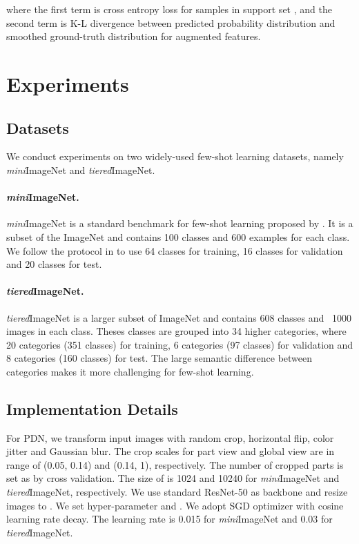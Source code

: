 \documentclass{article}
\begin{document}
where the first term is cross entropy loss for samples in support set , and the second term is K-L divergence between predicted probability distribution  and smoothed ground-truth distribution  for augmented features.

\section{Experiments}

\subsection{Datasets}
We conduct experiments on two widely-used few-shot learning datasets, namely \emph{mini}ImageNet and \emph{tiered}ImageNet. 
\paragraph{\emph{mini}ImageNet.} \emph{mini}ImageNet is a standard benchmark for few-shot learning proposed by \cite{vinyals2016matching}. It is a subset of the ImageNet \cite{ILSVRC15} and contains 100 classes and 600 examples for each class. We follow the protocol in \cite{Ravi2017OptimizationAA} to use 64 classes for training, 16 classes for validation and 20 classes for test. 

\paragraph{\emph{tiered}ImageNet.} \emph{tiered}ImageNet \cite{ren2018metalearning} is a larger subset of ImageNet and contains 608 classes and ~1000 images in each class. Theses classes are grouped into 34 higher categories, where 20 categories (351 classes) for training, 6 categories (97 classes) for validation and 8 categories (160 classes) for test. The large semantic difference between categories makes it more challenging for few-shot learning. 

\subsection{Implementation Details} 
For PDN, we transform input images with random crop, horizontal flip, color jitter and Gaussian blur. The crop scales for part view and global view are in range of (0.05, 0.14) and (0.14, 1), respectively. The number of cropped parts is set as  by cross validation. The size of  is 1024 and 10240 for \emph{mini}ImageNet and \emph{tiered}ImageNet, respectively. We use standard ResNet-50 as backbone and resize images to . We set hyper-parameter  and . We adopt SGD optimizer with cosine learning rate decay. The learning rate is 0.015 for \emph{mini}ImageNet and 0.03 for \emph{tiered}ImageNet.
\end{document}
